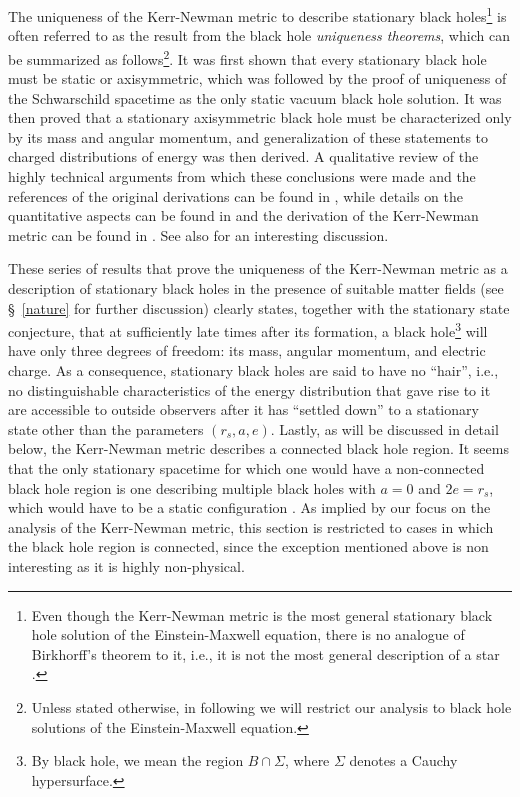 \documentclass[
12pt,		%
openright,	%
twoside,  %
a4paper,			%
chapter=TITLE,		%
english,			%
french,				%
spanish,			%
brazil				%
]{USPSC-classe/USPSC}
\begin{document}
The uniqueness of the Kerr-Newman metric to describe stationary black holes\footnote{Even though the Kerr-Newman metric is the most general stationary black hole solution of the Einstein-Maxwell equation, there is no analogue of Birkhorff's theorem to it, i.e., it is not the most general description of a star \cite{Townsend1997}.} is often referred to as the result from the black hole \textit{uniqueness theorems}, which can be summarized as follows\footnote{Unless stated otherwise, in following we will restrict our analysis to black hole solutions of the Einstein-Maxwell equation.}. It was first shown that every stationary black hole must be static or axisymmetric, which was followed by the proof of uniqueness of the Schwarschild spacetime as the only static vacuum black hole solution. It was then proved that a stationary axisymmetric black hole must be characterized only by its mass and angular momentum, and generalization of these statements to charged distributions of energy was then derived. A qualitative review of the highly technical arguments from which these conclusions were made and the references of the original derivations can be found in \cite{Robinson2009}, while details on the quantitative aspects can be found in \cite{Heusler1996} and the derivation of the Kerr-Newman metric can be found in \cite{Frolov1998}. See also \cite{Landsman2021} for an interesting discussion.

These series of results that prove the uniqueness of the Kerr-Newman metric as a description of stationary black holes in the presence of suitable matter fields (see \S~\ref{nature} for further discussion) clearly states, together with the stationary state conjecture, that at sufficiently late times after its formation, a black hole\footnote{By black hole, we mean the region $B\cap\Sigma$, where $\Sigma$ denotes a Cauchy hypersurface.} will have only three degrees of freedom: its mass, angular momentum, and electric charge. As a consequence, stationary black holes are said to have no ``hair'', i.e., no distinguishable characteristics of the energy distribution that gave rise to it are accessible to outside observers after it has ``settled down'' to a stationary state other than the parameters $(r_s,a,e)$. Lastly, as will be discussed in detail below, the Kerr-Newman metric describes a connected black hole region. It seems that the only stationary spacetime for which one would have a non-connected black hole region is one describing multiple black holes with $a=0$ and $2e=r_s$, which would have to be a static configuration \cite{Hartle1972,Neugebaur2009}. As implied by our focus on the analysis of the Kerr-Newman metric, this section is restricted to cases in which the black hole region is connected, since the exception mentioned above is non interesting as it is highly non-physical.
\end{document}
